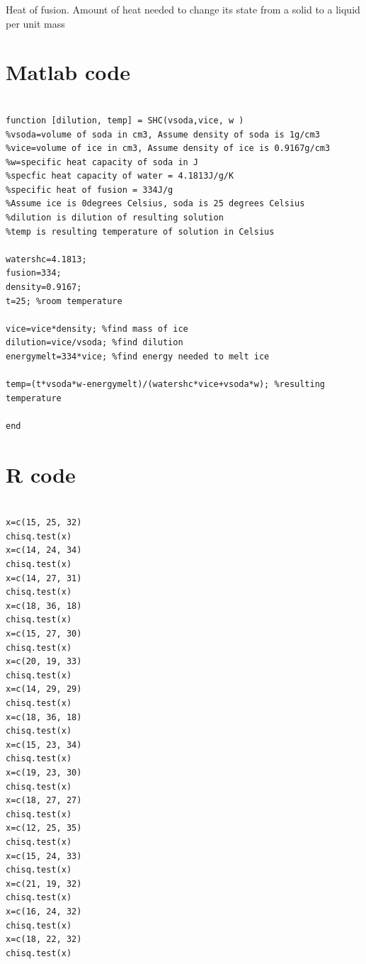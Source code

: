 \documentclass[oneside,12pt]{report}
\begin{document}
\noindent Heat of fusion. Amount of heat needed to change its state from a solid to a liquid per unit mass

\chapter{Matlab code}\label{Matlab code}
\begin{lstlisting}[caption= Matlab code for calculating resulting temperature and dilution, label = matlab]

function [dilution, temp] = SHC(vsoda,vice, w )
%vsoda=volume of soda in cm3, Assume density of soda is 1g/cm3
%vice=volume of ice in cm3, Assume density of ice is 0.9167g/cm3
%w=specific heat capacity of soda in J
%specfic heat capacity of water = 4.1813J/g/K
%specific heat of fusion = 334J/g
%Assume ice is 0degrees Celsius, soda is 25 degrees Celsius
%dilution is dilution of resulting solution
%temp is resulting temperature of solution in Celsius

watershc=4.1813;
fusion=334;
density=0.9167;
t=25; %room temperature

vice=vice*density; %find mass of ice
dilution=vice/vsoda; %find dilution
energymelt=334*vice; %find energy needed to melt ice

temp=(t*vsoda*w-energymelt)/(watershc*vice+vsoda*w); %resulting temperature

end
\end{lstlisting}
\vspace{5pt}

\chapter{R code}\label{R}
\begin{lstlisting}[caption= R code for implementing Pearson's chi-squared test, label = Rcode]

x=c(15, 25, 32)
chisq.test(x)
x=c(14, 24, 34)
chisq.test(x)
x=c(14, 27, 31)
chisq.test(x)
x=c(18, 36, 18)
chisq.test(x)
x=c(15, 27, 30)
chisq.test(x)
x=c(20, 19, 33)
chisq.test(x)
x=c(14, 29, 29)
chisq.test(x)
x=c(18, 36, 18)
chisq.test(x)
x=c(15, 23, 34)
chisq.test(x)
x=c(19, 23, 30)
chisq.test(x)
x=c(18, 27, 27)
chisq.test(x)
x=c(12, 25, 35)
chisq.test(x)
x=c(15, 24, 33)
chisq.test(x)
x=c(21, 19, 32)
chisq.test(x)
x=c(16, 24, 32)
chisq.test(x)
x=c(18, 22, 32)
chisq.test(x)
\end{lstlisting}
\vspace{5pt}



\renewcommand\bibname{Selected Bibliography Including Cited Works}
\nocite{*}  %

\end{document}
